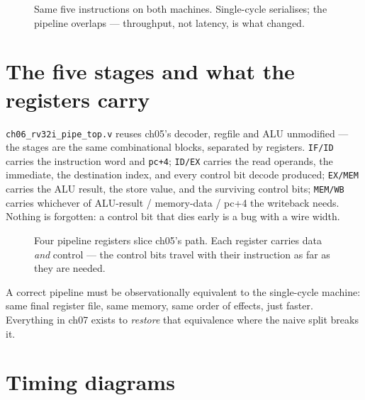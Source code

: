 \begin{figure}[t]
\centering

\caption[Laundry timeline]{Same five instructions on both machines.
Single-cycle serialises; the pipeline overlaps --- throughput, not
latency, is what changed.}
\label{fig:timeline06}
\end{figure}

\section{The five stages and what the registers carry}
\label{sec:stages06}

\begin{example}\label{ex:regs06}
\texttt{ch06\_rv32i\_pipe\_top.v} reuses ch05's decoder, regfile and
ALU unmodified --- the stages are the same combinational blocks,
separated by registers. \texttt{IF/ID} carries the instruction word
and \texttt{pc+4}; \texttt{ID/EX} carries the read operands, the
immediate, the destination index, and every control bit decode
produced; \texttt{EX/MEM} carries the ALU result, the store value,
and the surviving control bits; \texttt{MEM/WB} carries whichever
of ALU-result / memory-data / pc+4 the writeback needs. Nothing is
forgotten: a control bit that dies early is a bug with a wire width.
\end{example}

\begin{figure}[t]
\centering

\caption[Five-stage datapath]{Four pipeline registers slice ch05's
path. Each register carries data \emph{and} control --- the control
bits travel with their instruction as far as they are needed.}
\label{fig:5stage06}
\end{figure}

\begin{checkpoint}\label{cp:invariant06}
A correct pipeline must be observationally equivalent to the
single-cycle machine: same final register file, same memory, same
order of effects, just faster. Everything in ch07 exists to
\emph{restore} that equivalence where the naive split breaks it.
\end{checkpoint}

\section{Timing diagrams}
\label{sec:timing06}

